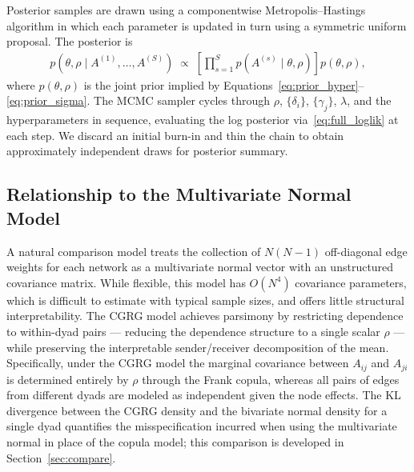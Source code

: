 Posterior samples are drawn using a componentwise
Metropolis--Hastings algorithm in which each parameter is updated in
turn using a symmetric uniform proposal.  The posterior is
%
\begin{align}
p(\theta, \rho \mid A^{(1)},\ldots,A^{(S)})
  \;\propto\;
  \left[\prod_{s=1}^{S} p(A^{(s)} \mid \theta, \rho)\right]
  p(\theta, \rho),
\end{align}
%
where $p(\theta,\rho)$ is the joint prior implied by
Equations~\eqref{eq:prior_hyper}--\eqref{eq:prior_sigma}.
The MCMC sampler cycles through $\rho$, $\{\delta_i\}$,
$\{\gamma_j\}$, $\lambda$, and the hyperparameters in sequence,
evaluating the log posterior via~\eqref{eq:full_loglik} at each
step.  We discard an initial burn-in and thin the chain to obtain
approximately independent draws for posterior summary.

\subsection{Relationship to the Multivariate Normal Model}

A natural comparison model treats the collection of $N(N-1)$ off-diagonal
edge weights for each network as a multivariate normal vector with an
unstructured covariance matrix.  While flexible, this model has
$O(N^4)$ covariance parameters, which is difficult to estimate with
typical sample sizes, and offers little structural interpretability.
The CGRG model achieves parsimony by restricting dependence to
within-dyad pairs — reducing the dependence structure to a single
scalar $\rho$ — while preserving the interpretable sender/receiver
decomposition of the mean.  Specifically, under the CGRG model
the marginal covariance between $A_{ij}$ and $A_{ji}$ is determined
entirely by $\rho$ through the Frank copula, whereas all pairs of edges
from different dyads are modeled as independent given the node effects.
The KL divergence between the CGRG density and the bivariate normal
density for a single dyad quantifies the misspecification incurred
when using the multivariate normal in place of the copula model;
this comparison is developed in Section~\ref{sec:compare}.

